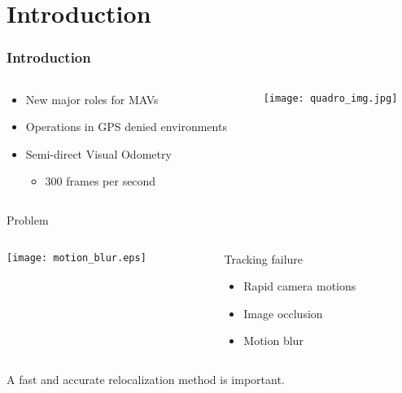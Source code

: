 
\section{Introduction}
\label{sec:introduction}


\begin{frame}
  \frametitle{Introduction}

  \begin{columns}
    \begin{column}{.48\textwidth}

      \begin{itemize}
        \item New major roles for MAVs
        \item Operations in GPS denied environments
        \item Semi-direct Visual Odometry~\cite{Forster2014}
          \begin{itemize}
            \item 300 frames per second
          \end{itemize}
      \end{itemize}

    \end{column}

    \begin{column}{.48\textwidth}
        \texttt{[image: quadro\_img.jpg]}
    \end{column}
  \end{columns}

\end{frame}


\begin{frame}[t]{Problem}

  \begin{columns}
    \begin{column}{0.7\textwidth}
      \texttt{[image: motion\_blur.eps]}
      
    \end{column}

    \begin{column}{0.3\textwidth}

      \begin{block}{Tracking failure}
        \begin{itemize}
          \item Rapid camera motions
          \item Image occlusion
          \item Motion blur
        \end{itemize}
      \end{block}

    \end{column}
  \end{columns}

  \qquad A fast and accurate relocalization method is important.
  
\end{frame}

